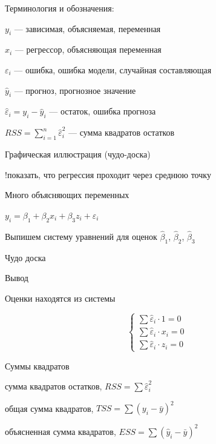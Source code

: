 \documentclass[ignorenonframetext,]{beamer}
\begin{document}
\begin{frame}{Терминология и обозначения:}

$y_i$ --- зависимая, объясняемая, переменная

$x_i$ --- регрессор, объясняющая переменная

$\varepsilon_i$ --- ошибка, ошибка модели, случайная составляющая

$\hat{y}_i$ --- прогноз, прогнозное значение

$\hat{\varepsilon}_i=y_i-\hat{y}_i$ --- остаток, ошибка прогноза

$RSS=\sum_{i=1}^n \hat{\varepsilon}_i^2$ --- сумма квадратов остатков

\end{frame}

\begin{frame}{Графическая иллюстрация (чудо-доска)}

!показать, что регрессия проходит через среднюю точку

\end{frame}

\begin{frame}{Много объясняющих переменных}

$y_i=\beta_1+\beta_2 x_i +\beta_3 z_i+\varepsilon_i$

Выпишем систему уравнений для оценок $\hat{\beta}_1$, $\hat{\beta}_2$,
$\hat{\beta}_3$

\end{frame}

\begin{frame}{Чудо доска}

\end{frame}

\begin{frame}{Вывод}

Оценки находятся из системы

\[
\begin{cases}
\sum \hat{\varepsilon}_i \cdot 1 =0 \\
\sum \hat{\varepsilon}_i \cdot x_i =0 \\
\sum \hat{\varepsilon}_i \cdot z_i =0
\end{cases}
\]

\end{frame}

\begin{frame}{Суммы квадратов}

сумма квадратов остатков, $RSS=\sum \hat{\varepsilon}_i^2$

общая сумма квадратов, $TSS=\sum (y_i-\bar{y})^2$

объясненная сумма квадратов, $ESS=\sum (\hat{y}_i-\bar{y})^2$

\end{frame}
\end{document}
